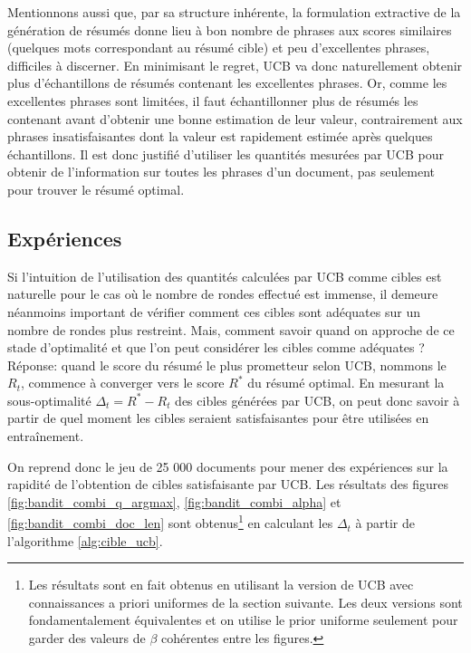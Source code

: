 Mentionnons aussi que, par sa structure inhérente, la formulation extractive de la génération 
de résumés donne lieu à bon nombre de phrases aux scores similaires (quelques mots correspondant
au résumé cible) et peu d'excellentes phrases, difficiles à discerner.
En minimisant le regret, UCB va donc naturellement obtenir plus d'échantillons de résumés contenant 
les excellentes phrases.
Or, comme les excellentes phrases sont limitées, il faut échantillonner plus de résumés les contenant
avant d'obtenir une bonne estimation de leur valeur, contrairement aux phrases insatisfaisantes 
dont la valeur est rapidement estimée après quelques échantillons.
Il est donc justifié d'utiliser les quantités mesurées par UCB pour obtenir de l'information 
sur toutes les phrases d'un document, pas seulement pour trouver le résumé optimal.

\subsection{Expériences}

Si l'intuition de l'utilisation des quantités calculées par UCB comme cibles est naturelle
pour le cas où le nombre de rondes effectué est immense, il demeure néanmoins important
de vérifier comment ces cibles sont adéquates sur un nombre de rondes plus restreint.
Mais, comment savoir quand on approche de ce stade d'optimalité et que 
l'on peut considérer les cibles comme adéquates ?
Réponse: quand le score du résumé le plus prometteur selon UCB, nommons le $R_t$,
commence à converger vers le score $R^*$ du résumé optimal.
En mesurant la sous-optimalité $\Delta_t = R^* - R_t$ des cibles générées
par UCB, on peut donc savoir à partir de quel moment les cibles seraient satisfaisantes
pour être utilisées en entraînement.

On reprend donc le jeu de 25 000 documents pour mener des expériences 
sur la rapidité de l'obtention de cibles satisfaisante par UCB.
Les résultats des figures \ref{fig:bandit_combi_q_argmax}, \ref{fig:bandit_combi_alpha}
et \ref{fig:bandit_combi_doc_len} sont obtenus\footnote{Les résultats sont en fait obtenus 
en utilisant la version de UCB avec connaissances a priori uniformes de la section suivante.
Les deux versions sont fondamentalement équivalentes et on utilise le prior uniforme 
seulement pour garder des valeurs de $\beta$ cohérentes entre les figures.} en calculant les $\Delta_t$ à partir de
l'algorithme \ref{alg:cible_ucb}.

